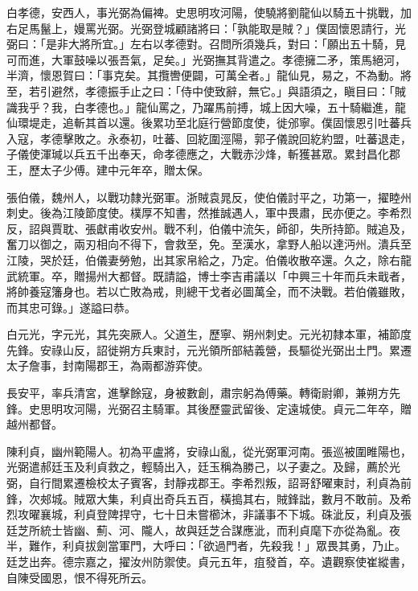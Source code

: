 \begin{pinyinscope}
 白孝德，安西人，事光弼為偏裨。史思明攻河陽，使驍將劉龍仙以騎五十挑戰，加右足馬鬣上，嫚罵光弼。光弼登城顧諸將曰：「孰能取是賊？」僕固懷恩請行，光弼曰：「是非大將所宜。」左右以孝德對。召問所須幾兵，對曰：「願出五十騎，見可而進，大軍鼓噪以張吾氣，足矣。」光弼撫其背遣之。孝德擁二矛，策馬絕河，半濟，懷恩賀曰：「事克矣。其攬轡便闢，可萬全者。」龍仙見，易之，不為動。將至，若引避然，孝德振手止之曰：「侍中使致辭，無它。」與語須之，瞋目曰：「賊識我乎？我，白孝德也。」龍仙罵之，乃躍馬前搏，城上因大噪，五十騎繼進，龍仙環堤走，追斬其首以還。後累功至北庭行營節度使，徙邠寧。僕固懷恩引吐蕃兵入寇，孝德擊敗之。永泰初，吐蕃、回紇圍涇陽，郭子儀說回紇約盟，吐蕃退走，子儀使渾瑊以兵五千出奉天，命孝德應之，大戰赤沙烽，斬獲甚眾。累封昌化郡王，歷太子少傅。建中元年卒，贈太保。



 張伯儀，魏州人，以戰功隸光弼軍。浙賊袁晁反，使伯儀討平之，功第一，擢睦州刺史。後為江陵節度使。樸厚不知書，然推誠遇人，軍中畏肅，民亦便之。李希烈反，詔與賈耽、張獻甫收安州。戰不利，伯儀中流矢，師卻，失所持節。賊追及，奮刀以御之，兩刃相向不得下，會救至，免。至漢水，拿野人船以達沔州。潰兵至江陵，哭於廷，伯儀妻勞勉，出其家帛給之，乃定。伯儀收散卒還。久之，除右龍武統軍。卒，贈揚州大都督。既請謚，博士李吉甫議以「中興三十年而兵未戢者，將帥養寇籓身也。若以亡敗為戒，則總干戈者必圖萬全，而不決戰。若伯儀雖敗，而其忠可錄。」遂謚曰恭。



 白元光，字元光，其先突厥人。父道生，歷寧、朔州刺史。元光初隸本軍，補節度先鋒。安祿山反，詔徙朔方兵東討，元光領所部結義營，長驅從光弼出土門。累遷太子詹事，封南陽郡王，為兩都游弈使。



 長安平，率兵清宮，進擊餘寇，身被數創，肅宗躬為傅藥。轉衛尉卿，兼朔方先鋒。史思明攻河陽，光弼召主騎軍。其後歷靈武留後、定遠城使。貞元二年卒，贈越州都督。



 陳利貞，幽州範陽人。初為平盧將，安祿山亂，從光弼軍河南。張巡被圍睢陽也，光弼遣郝廷玉及利貞救之，輕騎出入，廷玉稱為勝己，以子妻之。及歸，薦於光弼，自行間累遷檢校太子賓客，封靜戎郡王。李希烈叛，詔哥舒曜東討，利貞為前鋒，次郟城。賊眾大集，利貞出奇兵五百，橫搗其右，賊鋒詘，數月不敢前。及希烈攻曜襄城，利貞登陴捍守，七十日未嘗櫛沐，非議事不下城。硃泚反，利貞及張廷芝所統士皆幽、薊、河、隴人，故與廷芝合謀應泚，而利貞麾下亦從為亂。夜半，難作，利貞拔劍當軍門，大呼曰：「欲過門者，先殺我！」眾畏其勇，乃止。廷芝出奔。德宗嘉之，擢汝州防禦使。貞元五年，疽發首，卒。遺觀察使崔縱書，自陳受國恩，恨不得死所云。




\end{pinyinscope}
